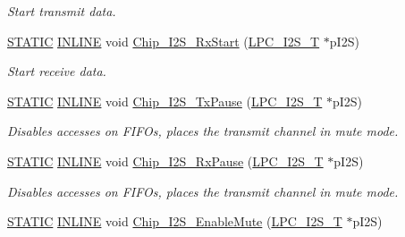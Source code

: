 \begin{DoxyCompactItemize}
\begin{DoxyCompactList}\small\item\em Start transmit data. \end{DoxyCompactList}\item 
\hyperlink{group___l_p_c___types___public___macros_ga10b2d890d871e1489bb02b7e70d9bdfb}{S\+T\+A\+T\+IC} \hyperlink{spifi__18xx__43xx_8h_a2eb6f9e0395b47b8d5e3eeae4fe0c116}{I\+N\+L\+I\+NE} void \hyperlink{group___i2_s__18_x_x__43_x_x_ga42eb351f08a2dea90fde3ba14d1698e3}{Chip\+\_\+\+I2\+S\+\_\+\+Rx\+Start} (\hyperlink{struct_l_p_c___i2_s___t}{L\+P\+C\+\_\+\+I2\+S\+\_\+T} $\ast$p\+I2S)
\begin{DoxyCompactList}\small\item\em Start receive data. \end{DoxyCompactList}\item 
\hyperlink{group___l_p_c___types___public___macros_ga10b2d890d871e1489bb02b7e70d9bdfb}{S\+T\+A\+T\+IC} \hyperlink{spifi__18xx__43xx_8h_a2eb6f9e0395b47b8d5e3eeae4fe0c116}{I\+N\+L\+I\+NE} void \hyperlink{group___i2_s__18_x_x__43_x_x_ga0487f27c97c88ea9d2bf9adc6ec4e469}{Chip\+\_\+\+I2\+S\+\_\+\+Tx\+Pause} (\hyperlink{struct_l_p_c___i2_s___t}{L\+P\+C\+\_\+\+I2\+S\+\_\+T} $\ast$p\+I2S)
\begin{DoxyCompactList}\small\item\em Disables accesses on F\+I\+F\+Os, places the transmit channel in mute mode. \end{DoxyCompactList}\item 
\hyperlink{group___l_p_c___types___public___macros_ga10b2d890d871e1489bb02b7e70d9bdfb}{S\+T\+A\+T\+IC} \hyperlink{spifi__18xx__43xx_8h_a2eb6f9e0395b47b8d5e3eeae4fe0c116}{I\+N\+L\+I\+NE} void \hyperlink{group___i2_s__18_x_x__43_x_x_ga0f7d40cc029ebd29091c0f3699bd1fe9}{Chip\+\_\+\+I2\+S\+\_\+\+Rx\+Pause} (\hyperlink{struct_l_p_c___i2_s___t}{L\+P\+C\+\_\+\+I2\+S\+\_\+T} $\ast$p\+I2S)
\begin{DoxyCompactList}\small\item\em Disables accesses on F\+I\+F\+Os, places the transmit channel in mute mode. \end{DoxyCompactList}\item 
\hyperlink{group___l_p_c___types___public___macros_ga10b2d890d871e1489bb02b7e70d9bdfb}{S\+T\+A\+T\+IC} \hyperlink{spifi__18xx__43xx_8h_a2eb6f9e0395b47b8d5e3eeae4fe0c116}{I\+N\+L\+I\+NE} void \hyperlink{group___i2_s__18_x_x__43_x_x_ga3977adf6afb42ea9da7c764ef36efa6e}{Chip\+\_\+\+I2\+S\+\_\+\+Enable\+Mute} (\hyperlink{struct_l_p_c___i2_s___t}{L\+P\+C\+\_\+\+I2\+S\+\_\+T} $\ast$p\+I2S)

\end{DoxyCompactItemize}
